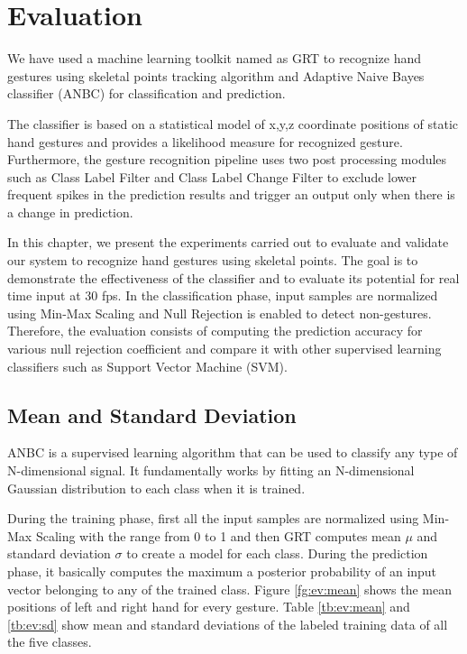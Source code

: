 \chapter{Evaluation}
We have used a machine learning toolkit named as GRT to recognize hand gestures using skeletal points tracking algorithm and Adaptive Naive Bayes classifier (ANBC) for classification and prediction. 

The classifier is based on a statistical model of x,y,z coordinate positions of static hand gestures and provides a likelihood measure for recognized gesture. Furthermore, the gesture recognition pipeline uses two post processing modules such as Class Label Filter and Class Label Change Filter to exclude lower frequent spikes in the prediction results and trigger an output only when there is a change in prediction.

In this chapter, we present the experiments carried out to evaluate and validate our system to recognize hand gestures using skeletal points. The goal is to demonstrate the effectiveness of the classifier and to evaluate its potential for real time input at 30 fps. In the classification phase, input samples are normalized using Min-Max Scaling and Null Rejection is enabled to detect non-gestures. Therefore, the evaluation consists of computing the prediction accuracy for various null rejection coefficient and compare it with other supervised learning classifiers such as Support Vector Machine (SVM).



\section{Mean and Standard Deviation}
ANBC is a supervised learning algorithm that can be used to classify any type of N-dimensional signal. It fundamentally works by fitting an N-dimensional Gaussian distribution to each class when it is trained.

During the training phase, first all the input samples are normalized using Min-Max Scaling with the range from 0 to 1 and then GRT computes mean $\mu$ and standard deviation $\sigma$ to create a model for each class. During the prediction phase, it basically computes the maximum a posterior probability of an input vector belonging to any of the trained class. Figure \ref{fg:ev:mean} shows the mean positions of left and right hand for every gesture. Table \ref{tb:ev:mean} and \ref{tb:ev:sd} show mean and standard deviations of the labeled training data of all the five classes. 

